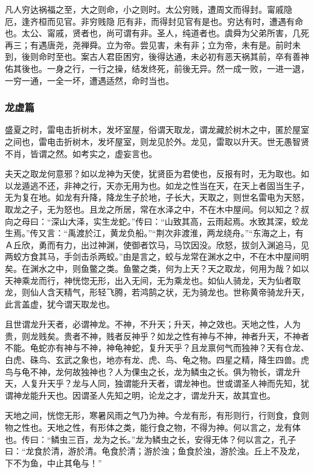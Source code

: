 \documentclass[]{article}
\begin{document}
凡人穷达祸福之至，大之则命，小之则时。太公穷贱，遭周文而得封。甯戚隐厄，逢齐桓而见官。非穷贱隐厄有非，而得封见官有是也。穷达有时，遭遇有命也。太公、甯戚，贤者也，尚可谓有非。圣人，纯道者也。虞舜为父弟所害，几死再三；有遇唐尧，尧禅舜。立为帝。尝见害，未有非；立为帝，未有是。前时未到，後则命时至也。案古人君臣困穷，後得达通，未必初有恶天祸其前，卒有善神佑其後也。一身之行，一行之操，结发终死，前後无异。然一成一败，一进一退，一穷一通，一全一坏，遭遇适然，命时当也。

\hypertarget{header-n227}{%
\subsubsection{龙虚篇}\label{header-n227}}

盛夏之时，雷电击折树木，发坏室屋，俗谓天取龙，谓龙藏於树木之中，匿於屋室之间也，雷电击折树木，发坏屋室，则龙见於外。龙见，雷取以升天。世无愚智贤不肖，皆谓之然。如考实之，虚妄言也。

夫天之取龙何意邪？如以龙神为天使，犹贤臣为君使也，反报有时，无为取也。如以龙遁逃不还，非神之行，天亦无用为也。如龙之性当在天，在天上者固当生子，无为复在地。如龙有升降，降龙生子於地，子长大，天取之，则世名雷电为天怒，取龙之子，无为怒也。且龙之所居，常在水泽之中，不在木中屋间。何以知之？叔向之母曰：``深山大泽，实生龙蛇。''传曰：``山致其高，云雨起焉。水致其深，蛟龙生焉。''传又言：``禹渡於江，黄龙负船。''``荆次非渡淮，两龙绕舟。''``东海之上，有Ａ丘欣，勇而有力，出过神渊，使御者饮马，马饮因没。欣怒，拔剑入渊追马，见两蛟方食其马，手剑击杀两蛟。''由是言之，蛟与龙常在渊水之中，不在木中屋间明矣。在渊水之中，则鱼鳖之类。鱼鳖之类，何为上天？天之取龙，何用为哉？如以天神乘龙而行，神恍惚无形，出入无间，无为乘龙也。如仙人骑龙，天为仙者取龙，则仙人含天精气，形轻飞腾，若鸿鹄之状，无为骑龙也。世称黄帝骑龙升天，此言盖虚，犹今谓天取龙也。

且世谓龙升天者，必谓神龙。不神，不升天；升天，神之效也。天地之性，人为贵，则龙贱矣。贵者不神，贱者反神乎？如龙之性有神与不神，神者升天，不神者不能。龟蛇亦有神与不神，神龟神蛇，复升天乎？且龙禀何气而独神？天有仓龙、白虎、硃鸟、玄武之象也，地亦有龙、虎、鸟、龟之物。四星之精，降生四兽。虎鸟与龟不神，龙何故独神也？人为倮虫之长，龙为鳞虫之长。俱为物长，谓龙升天，人复升天乎？龙与人同，独谓能升天者，谓龙神也。世或谓圣人神而先知，犹谓神龙能升天也。因谓圣人先知之明，论龙之才，谓龙升天，故其宜也。

天地之间，恍惚无形，寒暑风雨之气乃为神。今龙有形，有形则行，行则食，食则物之性也。天地之性，有形体之类，能行食之物，不得为神。何以言之，龙有体也。传曰：``鳞虫三百，龙为之长。''龙为鳞虫之长，安得无体？何以言之，孔子曰：``龙食於清，游於清。龟食於清；游於浊；鱼食於浊，游於浊。丘上不及龙，下不为鱼，中止其龟与！''
\end{document}
